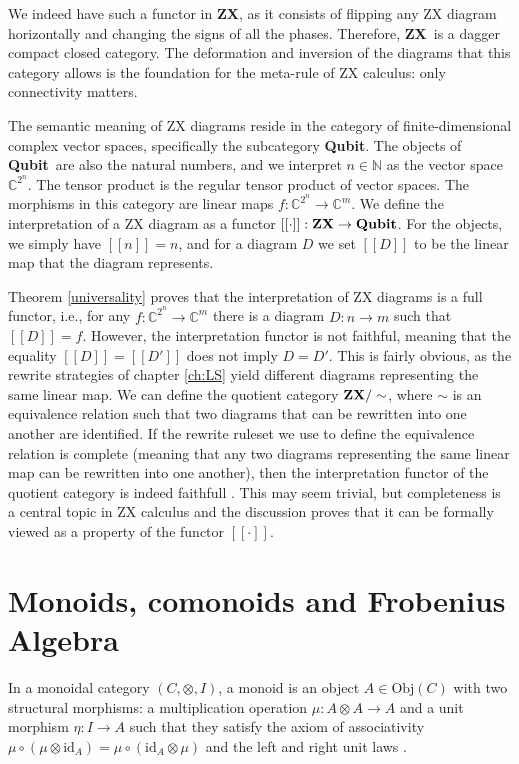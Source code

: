\documentclass[12pt, twoside, openany]{book}
\newcommand{\catname}[1]{{\normalfont\textbf{#1}}}
\newcommand{\ZXc}{\catname{ZX}}
\newcommand{\Qubit}{\catname{Qubit}}
\begin{document}
We indeed have such a functor in \ZXc, as it consists of flipping any ZX diagram horizontally and changing the signs of all the phases. Therefore, \ZXc \ is a dagger compact closed category. The deformation and inversion of the diagrams that this category allows is the foundation for the meta-rule of ZX calculus: only connectivity matters.

The semantic meaning of ZX diagrams reside in the category of finite-dimensional complex vector spaces, specifically the subcategory \Qubit \cite{vandewetering2020zxcalculusworkingquantumcomputer}. The objects of \Qubit \ are also the natural numbers, and we interpret $n \in \mathbb{N}$ as the vector space $\mathbb{C}^{2^n}$. The tensor product is the regular tensor product of vector spaces. The morphisms in this category are linear maps $f: \mathbb{C}^{2^n} \rightarrow \mathbb{C}^{m}$. We define the interpretation of a ZX diagram as a functor $[[\cdot]] : \ZXc \rightarrow \Qubit$. For the objects, we simply have $[[n]] = n$, and for a diagram $D$ we set $[[D]]$ to be the linear map that the diagram represents.

Theorem \ref{universality} proves that the interpretation of ZX diagrams is a full functor, i.e., for any $f: \mathbb{C}^{2^n} \rightarrow \mathbb{C}^{m}$ there is a diagram $D:n \rightarrow m$ such that $[[D]] = f$. However, the interpretation functor is not faithful, meaning that the equality $[[D]] = [[D']]$ does not imply $D = D'$. This is fairly obvious, as the rewrite strategies of chapter \ref{ch:LS} yield different diagrams representing the same linear map. We can define the quotient category $\ZXc / \sim $, where $\sim$ is an equivalence relation such that two diagrams that can be rewritten into one another are identified. If the rewrite ruleset we use to define the equivalence relation is complete (meaning that any two diagrams representing the same linear map can be rewritten into one another), then the interpretation functor of the quotient category is indeed faithfull \cite{vandewetering2020zxcalculusworkingquantumcomputer}. This may seem trivial, but completeness is a central topic in ZX calculus and the discussion proves that it can be formally viewed as a property of the functor $[[\cdot]]$.

\section*{Monoids, comonoids and Frobenius Algebra}

\begin{definition}
    In a monoidal category $(C, \otimes, I)$, a monoid is an object $A \in \text{Obj}(C)$ with two structural morphisms: a multiplication operation $\mu : A \otimes A \rightarrow A$ and a unit morphism $\eta : I \rightarrow A$ such that they satisfy the axiom of associativity $\mu \circ ( \mu \otimes \text{id}_A) = \mu \circ (\text{id}_A \otimes \mu)$ and the left and right unit laws \cite{Ross2004}. 
\end{definition}
\end{document}
